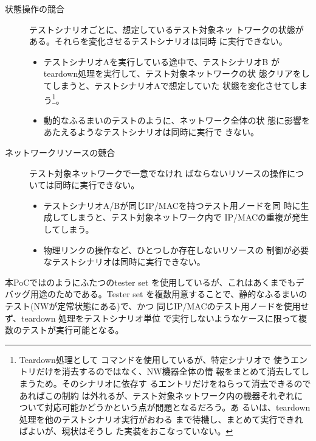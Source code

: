 \begin{description}
 \item[状態操作の競合] テストシナリオごとに、想定しているテスト対象ネッ
            トワークの状態がある。それらを変化させるテストシナリオは同時
            に実行できない。
            \begin{itemize}
             \item テストシナリオAを実行している途中で、テストシナリオB
                   がteardown処理を実行して、テスト対象ネットワークの状
                   態クリアをしてしまうと、テストシナリオAで想定していた
                   状態を変化させてしまう\footnote{Teardown処理として
                   コマンドを使用しているが、特定シナリオで
                   使うエントリだけを消去するのではなく、NW機器全体の情
                   報をまとめて消去してしまうため。そのシナリオに依存す
                   るエントリだけをねらって消去できるのであればこの制約
                   は外れるが、テスト対象ネットワーク内の機器それぞれに
                   ついて対応可能かどうかという点が問題となるだろう。あ
                   るいは、teardown処理を他のテストシナリオ実行がおわる
                   まで待機し、まとめて実行できればよいが、現状はそうし
                   た実装をおこなっていない。}。
             \item 動的なふるまいのテストのように、ネットワーク全体の状
                   態に影響をあたえるようなテストシナリオは同時に実行で
                   きない。
            \end{itemize}
 \item[ネットワークリソースの競合] テスト対象ネットワークで一意でなけれ
            ばならないリソースの操作については同時に実行できない。
            \begin{itemize}
             \item テストシナリオA/Bが同じIP/MACを持つテスト用ノードを同
                   時に生成してしまうと、テスト対象ネットワーク内で
                   IP/MACの重複が発生してしまう。
             \item 物理リンクの操作など、ひとつしか存在しないリソースの
                   制御が必要なテストシナリオは同時に実行できない。
            \end{itemize}
\end{description}

本PoCではのようにふたつのtester set
を使用しているが、これはあくまでもデバッグ用途のためである。Tester set
を複数用意することで、静的なふるまいのテスト(NWが定常状態にある)で、かつ
同じIP/MACのテスト用ノードを使用せず、teardown 処理をテストシナリオ単位
で実行しないようなケースに限って複数のテストが実行可能となる。

